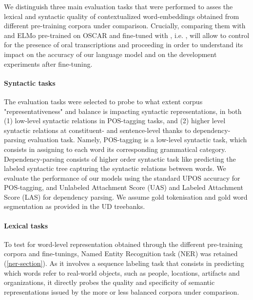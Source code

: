 We distinguish three main evaluation tasks that were performed
to asses the lexical and syntactic quality of contextualized word-embeddings obtained from different pre-training corpora under comparison.%
Crucially, comparing them with and ELMo pre-trained on OSCAR and fine-tuned with \Cabernet, i.e. \ELMocoscar, will allow to control for  the presence of oral transcriptions and proceeding in order to understand its impact on the accuracy of our language model and on the development experiments after fine-tuning.%

\paragraph{Syntactic tasks}
The evaluation tasks were selected to probe to what extent corpus "representativeness" and balance is impacting syntactic representations, in both (1) low-level syntactic relations in POS-tagging tasks, and (2) higher level syntactic relations at constituent- and sentence-level thanks to dependency-parsing evaluation task. Namely, POS-tagging is a low-level syntactic task, which consists in assigning to each word its corresponding grammatical category. Dependency-parsing consists of higher order syntactic task like predicting the labeled syntactic tree capturing the syntactic relations between words.
We evaluate the performance of our models using the standard UPOS accuracy for POS-tagging, and Unlabeled Attachment Score (UAS) and Labeled Attachment Score (LAS) for dependency parsing. We assume gold tokenisation and gold word segmentation as provided in the UD treebanks.

\paragraph{Lexical tasks}
To test for word-level representation obtained through the different pre-training corpora and fine-tunings, Named Entity Recognition task (NER) was retained (\ref{ner-section}). As it involves a sequence labeling task that consists in predicting which words refer to real-world objects, such as people, locations, artifacts and organizations, it directly probes the quality and specificity of semantic representations issued by the more or less balanced corpora under comparison.

